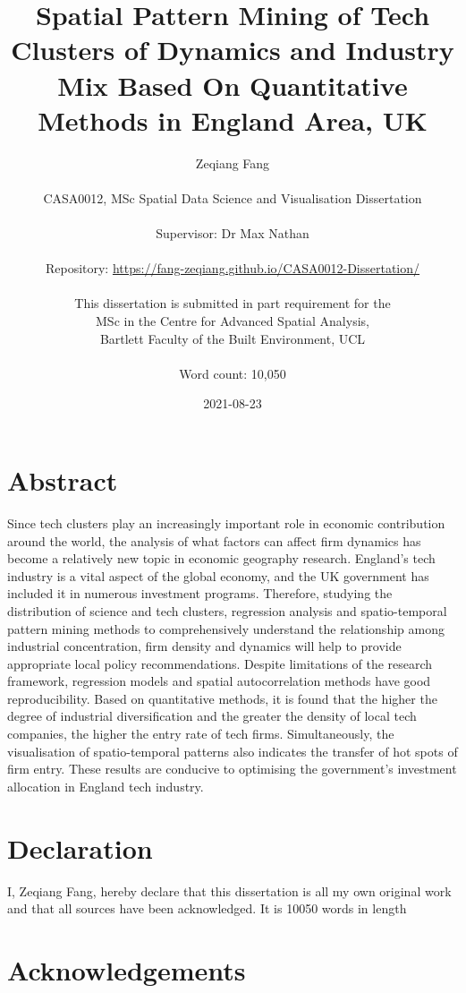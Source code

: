 \documentclass[
  12pt,
  oneside]{book}
\title{Spatial Pattern Mining of Tech Clusters of Dynamics and Industry Mix Based On Quantitative Methods in England Area, UK}
\author{Zeqiang Fang\\
~\\
CASA0012, MSc Spatial Data Science and Visualisation Dissertation\\
~\\
Supervisor: Dr Max Nathan\\
~\\
Repository: \url{https://fang-zeqiang.github.io/CASA0012-Dissertation/}\\
~\\
This dissertation is submitted in part requirement for the\\
MSc in the Centre for Advanced Spatial Analysis,\\
Bartlett Faculty of the Built Environment, UCL\\
~\\
Word count: 10,050}
\date{2021-08-23}
\begin{document}
\maketitle


\hypertarget{abstract}{%
\chapter*{Abstract}\label{abstract}}

Since tech clusters play an increasingly important role in economic contribution around the world, the analysis of what factors can affect firm dynamics has become a relatively new topic in economic geography research. England's tech industry is a vital aspect of the global economy, and the UK government has included it in numerous investment programs. Therefore, studying the distribution of science and tech clusters, regression analysis and spatio-temporal pattern mining methods to comprehensively understand the relationship among industrial concentration, firm density and dynamics will help to provide appropriate local policy recommendations. Despite limitations of the research framework, regression models and spatial autocorrelation methods have good reproducibility. Based on quantitative methods, it is found that the higher the degree of industrial diversification and the greater the density of local tech companies, the higher the entry rate of tech firms. Simultaneously, the visualisation of spatio-temporal patterns also indicates the transfer of hot spots of firm entry. These results are conducive to optimising the government's investment allocation in England tech industry.


\hypertarget{declaration}{%
\chapter*{Declaration}\label{declaration}}

I, Zeqiang Fang, hereby declare that this dissertation is all my own original work and that all sources have been acknowledged. It is 10050 words in length

\hypertarget{acknowledgements}{%
\chapter*{Acknowledgements}\label{acknowledgements}}
\end{document}

